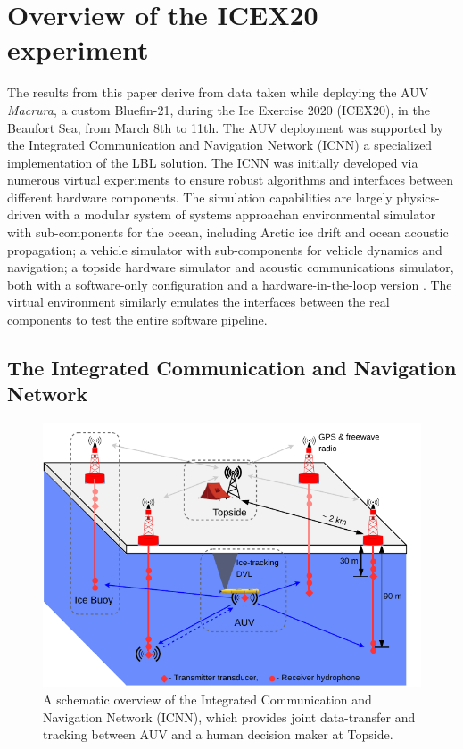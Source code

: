\clearpage
\section{Overview of the ICEX20 experiment}\label{sec:icex20}

The results from this paper derive from data taken while deploying the AUV \emph{Macrura}, a custom Bluefin-21, during the Ice Exercise 2020 (ICEX20), in the Beaufort Sea, from March 8th to 11th.
The AUV deployment was supported by the Integrated Communication and Navigation Network (ICNN) \citep{schneider_self-adapting_2020,Randeni2020,randeni_high-resolution_2021} a specialized implementation of the LBL solution.
The ICNN was initially developed via numerous virtual experiments to ensure robust algorithms and interfaces between different hardware components. 
The simulation capabilities are largely physics-driven with a modular system of systems approach\textemdash an environmental simulator with sub-components for the ocean, including Arctic ice drift and ocean acoustic propagation; a vehicle simulator with sub-components for vehicle dynamics and navigation; a topside hardware simulator and acoustic communications simulator, both with a software-only configuration and a hardware-in-the-loop version \citep{schneider_netsim_2018}.
The virtual environment similarly emulates the interfaces between the real components to test the entire software pipeline.

\subsection{The Integrated Communication and Navigation Network}

\begin{figure}[h!]
	\centering
	\includegraphics[width=\reprintcolumnwidth]{figs/Fig2.pdf}
	\caption{A schematic overview of the Integrated Communication and Navigation Network (ICNN), which provides joint data-transfer and tracking between AUV and a human decision maker at Topside.}
	\label{fig:icnnOverview}
\end{figure}

